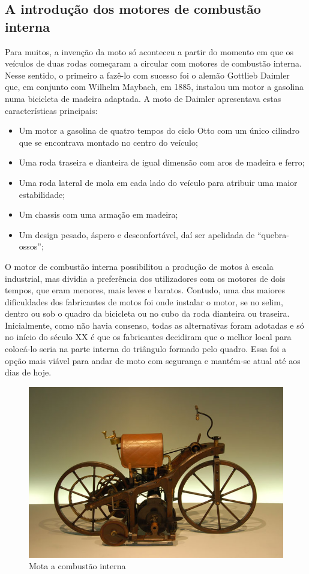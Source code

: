 \documentclass{report}
\begin{document}
\subsection*{A introdução dos motores de combustão interna}
\vspace{1cm}
Para muitos, a invenção da moto só aconteceu a partir do momento em que os veículos de duas rodas começaram a circular com motores de combustão interna. Nesse sentido, o primeiro a fazê-lo com sucesso foi o alemão Gottlieb Daimler que, em conjunto com Wilhelm Maybach, em 1885, instalou um motor a gasolina numa bicicleta de madeira adaptada. A moto de Daimler apresentava estas características principais:
\begin{itemize}
\item Um motor a gasolina de quatro tempos do ciclo Otto com um único cilindro que se encontrava montado no centro do veículo;
\item Uma roda traseira e dianteira de igual dimensão com aros de madeira e ferro;
\item Uma roda lateral de mola em cada lado do veículo para atribuir uma maior estabilidade;
\item Um chassis com uma armação em madeira;
\item Um design pesado, áspero e desconfortável, daí ser apelidada de “quebra-ossos”;
\end{itemize}
\vspace{5cm}
O motor de combustão interna possibilitou a produção de motos à escala industrial, mas dividia a preferência dos utilizadores com os motores de dois tempos, que eram menores, mais leves e baratos. Contudo, uma das maiores dificuldades dos fabricantes de motos foi onde instalar o motor, se no selim, dentro ou sob o quadro da bicicleta ou no cubo da roda dianteira ou traseira. Inicialmente, como não havia consenso, todas as alternativas foram adotadas e só no início do século XX é que os fabricantes decidiram que o melhor local para colocá-lo seria na parte interna do triângulo formado pelo quadro. Essa foi a opção mais viável para andar de moto com segurança e mantém-se atual até aos dias de hoje.

\begin{figure}[h]
\center
 \includegraphics[scale=0.5]{Mota a combustão interna.jpeg}%
\caption{Mota a combustão interna }
\label{figura:Mota a combustão interna}
\end{figure}
\end{document}
